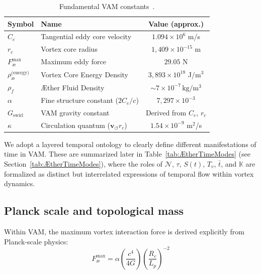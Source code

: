 \documentclass[preprint]{revtex4-2}
\begin{document}
\begin{table}[htbp]
    \centering
    \begin{tabular}{llc}
        \hline
        \toprule
        \textbf{Symbol} & \textbf{Name} & \textbf{Value (approx.)} \\
        \hline
        \midrule
        $C_e$ & Tangential eddy core velocity & $1.094 \times 10^6$ m/s \\
        $r_c$ & Vortex core radius & $1,409 \times 10^{-15}$ m \\
        $F^{\text{max}}_{\text{\ae}}$ & Maximum eddy force & $29.05$ N \\
        $\rho_\text{\ae}^\text{(energy)}$ & Vortex Core Energy Density & $3,893 \times 10^{18}$ J/m$^3$ \\
        $\rho_{\scriptscriptstyle\boldsymbol\!f}$ &  Æther Fluid Density & $\sim 7 \times 10^{-7}\, \mathrm{kg/m^3}$ \\
        $\alpha$ & Fine structure constant ($2 C_e/c$) & $7,297 \times 10^{-3}$\\
        $G_\text{swirl}$ & VAM gravity constant & Derived from $C_e$, $r_c$\\
        $\kappa$ & Circulation quantum ($\mathbf{v}_{\scriptscriptstyle\boldsymbol{\circlearrowleft}} r_c$) & $1.54 \times 10^{-9}$ m$^2$/s \\
        \hline
        \bottomrule
    \end{tabular}
    \caption{Fundamental VAM constants~\cite{vam2025field}.}
    \label{tab:VAMconstants}
\end{table}

We adopt a layered temporal ontology to clearly define different manifestations of time in VAM. These are summarized later in Table~\ref{tab:ÆtherTimeModes} (see Section~\ref{tab:ÆtherTimeModes}), where the roles of $\mathcal{N}$, $\tau$, $S(t)$, $T_v$, $\bar{t}$, and $\mathbb{K}$ are formalized as distinct but interrelated expressions of temporal flow within vortex dynamics.


\subsection*{Planck scale and topological mass}

Within VAM, the maximum vortex interaction force is derived explicitly from Planck-scale physics:
\begin{equation}
    F^{\text{max}}_{\text{\ae}} = \alpha  \left(\frac{c^4}{4G}\right) \left(\frac{R_c}{L_p}\right)^{-2}
\end{equation}
\end{document}
